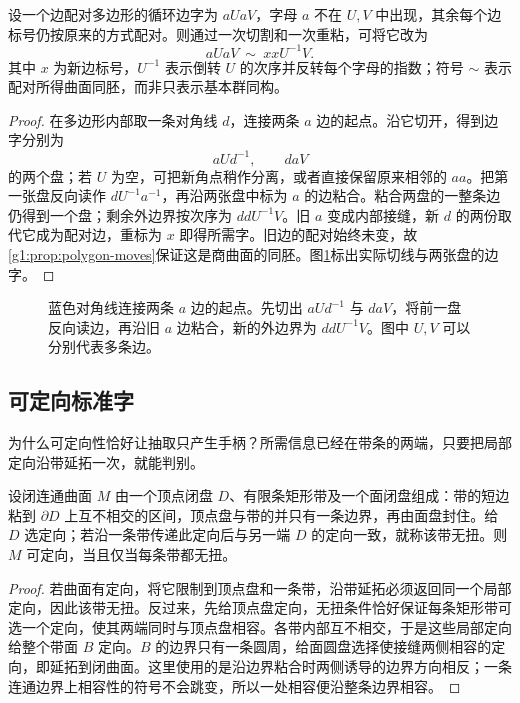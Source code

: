 \begin{lemma}\label{g1:lem:crosscap-word-move}
	设一个边配对多边形的循环边字为 \(aUaV\)，字母 \(a\) 不在 \(U,V\) 中出现，其余每个边标号仍按原来的方式配对。则通过一次切割和一次重粘，可将它改为
	\begin{equation}\label{g1:eq:crosscap-word-move}
		aUaV\ \sim\ xxU^{-1}V.
	\end{equation}
	其中 \(x\) 为新边标号，\(U^{-1}\) 表示倒转 \(U\) 的次序并反转每个字母的指数；符号 \(\sim\) 表示配对所得曲面同胚，而非只表示基本群同构。
\end{lemma}
\begin{proof}
	在多边形内部取一条对角线 \(d\)，连接两条 \(a\) 边的起点。沿它切开，得到边字分别为
	\[
		aUd^{-1},\qquad daV
	\]
	的两个盘；若 \(U\) 为空，可把新角点稍作分离，或者直接保留原来相邻的 \(aa\)。把第一张盘反向读作 \(dU^{-1}a^{-1}\)，再沿两张盘中标为 \(a\) 的边粘合。粘合两盘的一整条边仍得到一个盘；剩余外边界按次序为 \(ddU^{-1}V\)。旧 \(a\) 变成内部接缝，新 \(d\) 的两份取代它成为配对边，重标为 \(x\) 即得所需字。旧边的配对始终未变，故\cref{g1:prop:polygon-moves}保证这是商曲面的同胚。图\ref{g1:fig:crosscap-word-move}标出实际切线与两张盘的边字。
\end{proof}

\begin{figure}[htbp]
	\centering
	
	\caption[同向边对的切粘]{蓝色对角线连接两条 \(a\) 边的起点。先切出 \(aUd^{-1}\) 与 \(daV\)，将前一盘反向读边，再沿旧 \(a\) 边粘合，新的外边界为 \(ddU^{-1}V\)。图中 \(U,V\) 可以分别代表多条边。}
	\label{g1:fig:crosscap-word-move}
\end{figure}

\subsection{可定向标准字}
\label{g1:subsec:0604:02}

为什么可定向性恰好让抽取只产生手柄？所需信息已经在带条的两端，只要把局部定向沿带延拓一次，就能判别。

\begin{lemma}\label{g1:lem:band-orientation}
	设闭连通曲面 \(M\) 由一个顶点闭盘 \(D\)、有限条矩形带及一个面闭盘组成：带的短边粘到 \(\partial D\) 上互不相交的区间，顶点盘与带的并只有一条边界，再由面盘封住。给 \(D\) 选定向；若沿一条带传递此定向后与另一端 \(D\) 的定向一致，就称该带无扭。则 \(M\) 可定向，当且仅当每条带都无扭。
\end{lemma}
\begin{proof}
	若曲面有定向，将它限制到顶点盘和一条带，沿带延拓必须返回同一个局部定向，因此该带无扭。反过来，先给顶点盘定向，无扭条件恰好保证每条矩形带可选一个定向，使其两端同时与顶点盘相容。各带内部互不相交，于是这些局部定向给整个带面 \(B\) 定向。\(B\) 的边界只有一条圆周，给面圆盘选择使接缝两侧相容的定向，即延拓到闭曲面。这里使用的是沿边界粘合时两侧诱导的边界方向相反；一条连通边界上相容性的符号不会跳变，所以一处相容便沿整条边界相容。
\end{proof}

